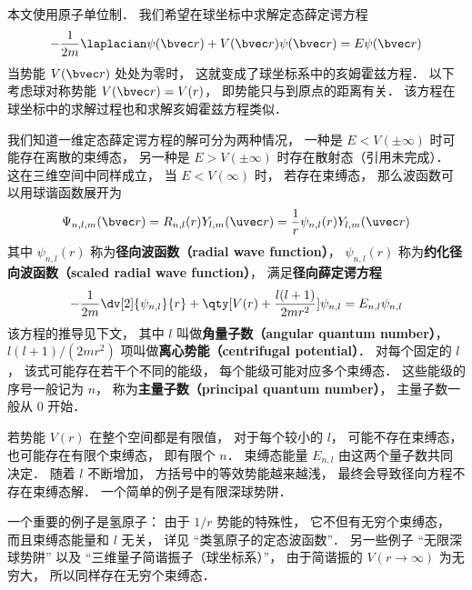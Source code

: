 

本文使用原子单位制． 我们希望在球坐标中求解定态薛定谔方程
\begin{equation}\label{RadSE_eq2}
-\frac{1}{2m}\laplacian \psi(\bvec r) + V(\bvec r)\psi(\bvec r) = E\psi(\bvec r)
\end{equation}
当势能 $V(\bvec r)$ 处处为零时， 这就变成了球坐标系中的亥姆霍兹方程． 以下考虑球对称势能 $V(\bvec r) = V(r)$， 即势能只与到原点的距离有关． 该方程在球坐标中的求解过程也和求解亥姆霍兹方程类似．

我们知道一维定态薛定谔方程的解可分为两种情况， 一种是 $E < V(\pm\infty)$ 时可能存在离散的束缚态， 另一种是 $E > V(\pm\infty)$ 时存在散射态（引用未完成）． 这在三维空间中同样成立， 当 $E < V(\infty)$ 时， 若存在束缚态， 那么波函数可以用球谐函数展开为
\begin{equation}\label{RadSE_eq4}
\Psi_{n, l,m}(\bvec r) = R_{n, l}(r) Y_{l,m}(\uvec r) = \frac{1}{r}\psi_{n, l}(r) Y_{l,m}(\uvec r)
\end{equation}
其中 $\psi_{n, l}(r)$ 称为\textbf{径向波函数（radial wave function）}， $\psi_{n, l}(r)$ 称为\textbf{约化径向波函数（scaled radial wave function）}， 满足\textbf{径向薛定谔方程}
\begin{equation}\label{RadSE_eq1}
-\frac{1}{2m} \dv[2]{\psi_{n, l}}{r} + \qty[V(r) + \frac{l(l + 1)}{2mr^2}]\psi_{n, l} = E_{n, l} \psi_{n, l}
\end{equation}
该方程的推导见下文， 其中 $l$ 叫做\textbf{角量子数（angular quantum number）}， $l(l + 1)/(2mr^2)$ 项叫做\textbf{离心势能（centrifugal potential）}． 对每个固定的 $l$， 该式可能存在若干个不同的能级， 每个能级可能对应多个束缚态． 这些能级的序号一般记为 $n$， 称为\textbf{主量子数（principal quantum number）}， 主量子数一般从 0 开始．

若势能 $V(r)$ 在整个空间都是有限值， 对于每个较小的 $l$， 可能不存在束缚态， 也可能存在有限个束缚态， 即有限个 $n$． 束缚态能量 $E_{n,l}$ 由这两个量子数共同决定． 随着 $l$ 不断增加， 方括号中的等效势能越来越浅， 最终会导致径向方程不存在束缚态解． 一个简单的例子是有限深球势阱．

一个重要的例子是氢原子： 由于 $1/r$ 势能的特殊性， 它不但有无穷个束缚态， 而且束缚态能量和 $l$ 无关， 详见 “类氢原子的定态波函数”． 另一些例子 “无限深球势阱” 以及 “三维量子简谐振子（球坐标系）”， 由于简谐振的 $V(r\to \infty)$ 为无穷大， 所以同样存在无穷个束缚态．


